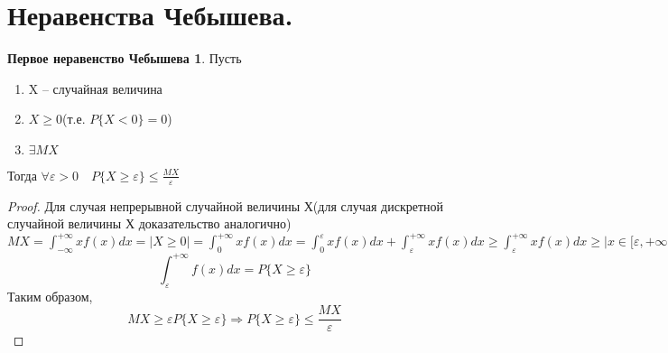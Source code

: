 \documentclass[a4paper, 12pt]{article}
\theoremstyle{definition}
\theoremstyle{leads}
\theoremstyle{example}
\begin{document}
\section{Неравенства Чебышева.}
	\newtheorem*{cheb}{Первое неравенство Чебышева}
	\begin{cheb}
	 Пусть
	\begin{enumerate}
		\item X -- случайная величина
		\item $X\geq 0$(т.е. $P\{X < 0\} = 0$)
		\item $\exists MX$
	\end{enumerate}	
    Тогда $\forall \varepsilon > 0 \quad P\{X \geq \varepsilon \} \leq \frac{MX}{\varepsilon}$
	\end{cheb}
    \begin{proof}
    	Для случая непрерывной случайной величины Х(для случая дискретной случайной величины Х доказательство аналогично)\\
    	$MX = \int_{-\infty}^{+\infty} xf(x)dx = |X \geq 0| = \int_{0}^{+\infty} xf(x)dx = \int_{0}^{\varepsilon} xf(x)dx + \int_{\varepsilon}^{+\infty} xf(x)dx \geq
    	\int_{\varepsilon}^{+\infty}xf(x)dx \geq |x \in [\varepsilon, +\infty) \rightarrow x \geq \varepsilon| \geq \varepsilon \int_{\varepsilon}^{+\infty} f(x)dx \geq \varepsilon P\{ X\geq \varepsilon\}$
    	\begin{displaymath}
    	\int_{\varepsilon}^{+\infty} f(x)dx = P\{X \geq \varepsilon\}
    	\end{displaymath}
    	Таким образом, 
    	\begin{displaymath}
    	MX \geq \varepsilon P\{X \geq \varepsilon\} \Longrightarrow P\{X \geq \varepsilon\} \leq \frac{MX}{\varepsilon}
    	\end{displaymath}
    \end{proof}
\end{document}
